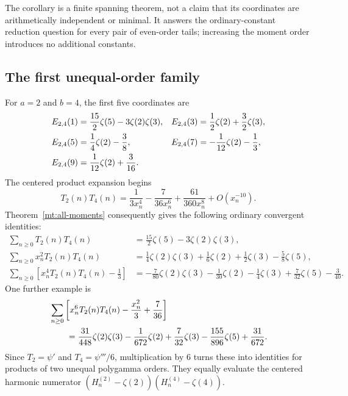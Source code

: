 \documentclass[11pt,letterpaper]{article}
\numberwithin{equation}{section}
\theoremstyle{plain}
\theoremstyle{definition}
\theoremstyle{remark}
\begin{document}
The corollary is a finite spanning theorem, not a claim that its
coordinates are arithmetically independent or minimal. It answers the
ordinary-constant reduction question for every pair of even-order
tails; increasing the moment order introduces no additional constants.

\subsection{The first unequal-order family}

For $a=2$ and $b=4$, the first five coordinates are
\begin{align}
 E_{2,4}(1)&=\frac{15}{2}\zeta(5)-3\zeta(2)\zeta(3),
 &E_{2,4}(3)&=\frac12\zeta(2)+\frac32\zeta(3),\notag\\
 E_{2,4}(5)&=\frac14\zeta(2)-\frac38,
 &E_{2,4}(7)&=-\frac1{12}\zeta(2)-\frac13,\label{mt:E24}\\
 E_{2,4}(9)&=\frac1{12}\zeta(2)+\frac3{16}.\notag
\end{align}
The centered product expansion begins
\begin{equation}\label{mt:T24-expansion}
 T_2(n)T_4(n)=\frac1{3x_n^4}-\frac7{36x_n^6}
                       +\frac{61}{360x_n^8}+O(x_n^{-10}).
\end{equation}
Theorem~\ref{mt:all-moments} consequently gives the following ordinary
convergent identities:
\begin{align}
 \sum_{n\ge0}T_2(n)T_4(n)
  &=\frac{15}{2}\zeta(5)-3\zeta(2)\zeta(3),
 \label{mt:V0}\\
 \sum_{n\ge0}x_n^2T_2(n)T_4(n)
  &=\frac14\zeta(2)\zeta(3)+\frac16\zeta(2)+\frac12\zeta(3)
                   -\frac58\zeta(5),
 \label{mt:V1}\\
 \sum_{n\ge0}\left[x_n^4T_2(n)T_4(n)-\frac13\right]
  &=-\frac7{80}\zeta(2)\zeta(3)-\frac1{30}\zeta(2)
      -\frac14\zeta(3)+\frac7{32}\zeta(5)-\frac3{40}.
 \label{mt:V2}
\end{align}
One further example is
\begin{align}
 &\sum_{n\ge0}\left[x_n^6T_2(n)T_4(n)-\frac{x_n^2}{3}+\frac7{36}\right]
 \notag\\
 &\qquad=\frac{31}{448}\zeta(2)\zeta(3)-\frac1{672}\zeta(2)
          +\frac7{32}\zeta(3)-\frac{155}{896}\zeta(5)
          +\frac{31}{672}.
 \label{mt:V3}
\end{align}
Since $T_2=\psi'$ and $T_4=\psi'''/6$, multiplication by $6$
turns these into identities for products of two unequal polygamma
orders. They equally evaluate the centered harmonic numerator
$(H_n^{(2)}-\zeta(2))(H_n^{(4)}-\zeta(4))$.
\end{document}
